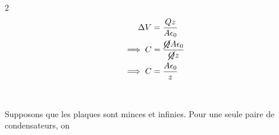 \documentclass[11pt, letterpaper]{article}
\begin{document}
\begin{multicols}{2}
\begin{align*}
    \Delta V &=  \frac{Qz}{A\epsilon_0} \\
    \implies C &= \frac{\cancel{Q}A \epsilon_0}{ \cancel{Q} z} \\
    \implies C &=  \frac{A \epsilon_0}{ z} 
\end{align*}
\\\\




Supposons que les plaques sont minces et infinies. Pour une seule paire de condensateurs, on 



\end{multicols}
\end{document}
